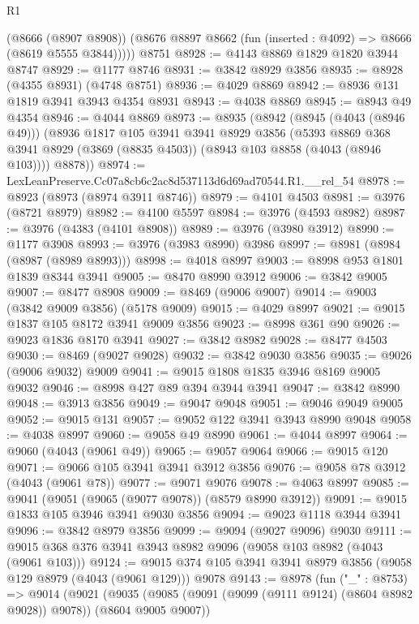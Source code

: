 \begin{lexlean}{R1}
\begin{coremodule}
        (@8666 (@8907 @8908))
        (@8676 @8897 @8662 (fun (inserted : @4092) => @8666 (@8619 @5555 @3844)))))
    @8751
@8928 := @4143 @8869 @1829 @1820 @3944 @8747
@8929 := @1177 @8746
@8931 := @3842 @8929 @3856
@8935 := @8928 (@4355 @8931) (@4748 @8751)
@8936 := @4029 @8869
@8942 := @8936 @131 @1819 @3941 @3943 @4354 @8931
@8943 := @4038 @8869
@8945 := @8943 @49 @4354
@8946 := @4044 @8869
@8973 := @8935
    (@8942
      (@8945 (@4043 (@8946 @49)))
      (@8936
        @1817
        @105
        @3941
        @3941
        @8929
        @3856
        (@5393 @8869 @368 @3941 @8929 (@3869 (@8835 @4503)) (@8943 @103 @8858 (@4043 (@8946 @103))))
        @8878))
@8974 := LexLeanPreserve.Cc07a8cb6c2ac8d537113d6d69ad70544.R1.__rel_54
@8978 := @8923 (@8973 (@8974 @3911 @8746))
@8979 := @4101 @4503
@8981 := @3976 (@8721 @8979)
@8982 := @4100 @5597
@8984 := @3976 (@4593 @8982)
@8987 := @3976 (@4383 (@4101 @8908))
@8989 := @3976 (@3980 @3912)
@8990 := @1177 @3908
@8993 := @3976 (@3983 @8990) @3986
@8997 := @8981 (@8984 (@8987 (@8989 @8993)))
@8998 := @4018 @8997
@9003 := @8998 @953 @1801 @1839 @8344 @3941
@9005 := @8470 @8990 @3912
@9006 := @3842 @9005
@9007 := @8477 @8908
@9009 := @8469 (@9006 @9007)
@9014 := @9003 (@3842 @9009 @3856) (@5178 @9009)
@9015 := @4029 @8997
@9021 := @9015 @1837 @105 @8172 @3941 @9009 @3856
@9023 := @8998 @361 @90
@9026 := @9023 @1836 @8170 @3941
@9027 := @3842 @8982
@9028 := @8477 @4503
@9030 := @8469 (@9027 @9028)
@9032 := @3842 @9030 @3856
@9035 := @9026 (@9006 @9032) @9009
@9041 := @9015 @1808 @1835 @3946 @8169 @9005 @9032
@9046 := @8998 @427 @89 @394 @3944 @3941
@9047 := @3842 @8990
@9048 := @3913 @3856
@9049 := @9047 @9048
@9051 := @9046 @9049 @9005
@9052 := @9015 @131
@9057 := @9052 @122 @3941 @3943 @8990 @9048
@9058 := @4038 @8997
@9060 := @9058 @49 @8990
@9061 := @4044 @8997
@9064 := @9060 (@4043 (@9061 @49))
@9065 := @9057 @9064
@9066 := @9015 @120
@9071 := @9066 @105 @3941 @3941 @3912 @3856
@9076 := @9058 @78 @3912 (@4043 (@9061 @78))
@9077 := @9071 @9076
@9078 := @4063 @8997
@9085 := @9041 (@9051 (@9065 (@9077 @9078)) (@8579 @8990 @3912))
@9091 := @9015 @1833 @105 @3946 @3941 @9030 @3856
@9094 := @9023 @1118 @3944 @3941
@9096 := @3842 @8979 @3856
@9099 := @9094 (@9027 @9096) @9030
@9111 := @9015 @368 @376 @3941 @3943 @8982 @9096 (@9058 @103 @8982 (@4043 (@9061 @103)))
@9124 := @9015 @374 @105 @3941 @3941 @8979 @3856 (@9058 @129 @8979 (@4043 (@9061 @129))) @9078
@9143 := @8978
    (fun ("_" : @8753) =>
    @9014
      (@9021
        (@9035 (@9085 (@9091 (@9099 (@9111 @9124) (@8604 @8982 @9028)) @9078)) (@8604 @9005 @9007))

\end{coremodule}
\end{lexlean}
